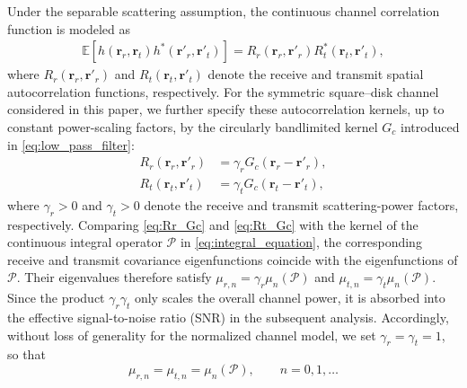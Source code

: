 \documentclass[lettersize,journal]{IEEEtran}
\theoremstyle{plain}
\begin{document}
Under the separable scattering assumption, the continuous channel correlation function is modeled as
\begin{align}
	\mathbb{E}\!\left[
	h(\mathbf{r}_r,\mathbf{r}_t)
	h^*(\mathbf{r}'_r,\mathbf{r}'_t)
	\right] =
	R_r(\mathbf{r}_r,\mathbf{r}'_r)
	R_t^*(\mathbf{r}_t,\mathbf{r}'_t),
	\label{eq:separable_correlation}
\end{align}
where $R_r(\mathbf{r}_r,\mathbf{r}'_r)$ and
$R_t(\mathbf{r}_t,\mathbf{r}'_t)$ denote the receive and transmit spatial autocorrelation functions, respectively. For the symmetric
square--disk channel considered in this paper, we further specify
these autocorrelation kernels, up to constant power-scaling factors,
by the circularly bandlimited kernel $G_c$ introduced in
\eqref{eq:low_pass_filter}:
\begin{align}
	R_r(\mathbf{r}_r,\mathbf{r}'_r)
	&=
	\gamma_r G_c(\mathbf{r}_r-\mathbf{r}'_r),
	\label{eq:Rr_Gc}\\
	R_t(\mathbf{r}_t,\mathbf{r}'_t)
	&=
	\gamma_t G_c(\mathbf{r}_t-\mathbf{r}'_t),
	\label{eq:Rt_Gc}
\end{align}
where $\gamma_r>0$ and $\gamma_t>0$ denote the receive and
transmit scattering-power factors, respectively. Comparing
\eqref{eq:Rr_Gc} and \eqref{eq:Rt_Gc} with the kernel of the
continuous integral operator $\mathcal{P}$ in
\eqref{eq:integral_equation}, the corresponding receive and transmit
covariance eigenfunctions coincide with the eigenfunctions of
$\mathcal{P}$. Their eigenvalues therefore satisfy
$\mu_{r,n}=\gamma_r\mu_n(\mathcal{P})$ and
$\mu_{t,n}=\gamma_t\mu_n(\mathcal{P})$. Since the product
$\gamma_r\gamma_t$ only scales the overall channel power, it is
absorbed into the effective signal-to-noise ratio (SNR) in the subsequent analysis.
Accordingly, without loss of generality for the normalized channel
model, we set $\gamma_r=\gamma_t=1$, so that
\begin{equation}
	\mu_{r,n}
	=
	\mu_{t,n}
	=
	\mu_n(\mathcal{P}),
	\qquad n=0,1,\ldots
	\label{eq:symmetric_covariance_eigenvalues}
\end{equation}
\end{document}
